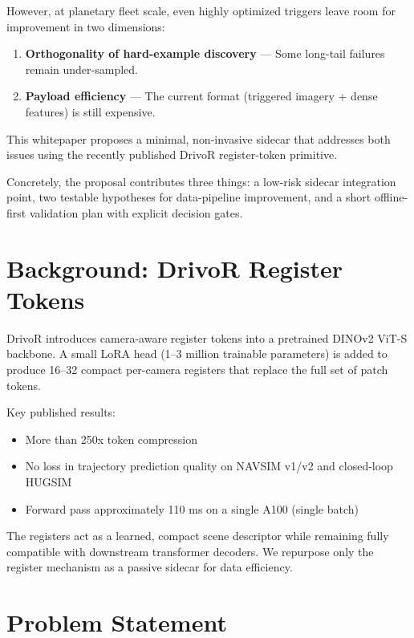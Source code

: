 \documentclass[11pt]{article}
\begin{document}
However, at planetary fleet scale, even highly optimized triggers leave room for improvement in two dimensions:

\begin{enumerate}
  \item \textbf{Orthogonality of hard-example discovery} --- Some long-tail failures remain under-sampled.
  \item \textbf{Payload efficiency} --- The current format (triggered imagery + dense features) is still expensive.
\end{enumerate}

This whitepaper proposes a minimal, non-invasive sidecar that addresses both issues using the recently published DrivoR register-token primitive.

Concretely, the proposal contributes three things: a low-risk sidecar integration point, two testable hypotheses for data-pipeline improvement, and a short offline-first validation plan with explicit decision gates.

\section{Background: DrivoR Register Tokens}

DrivoR \cite{kirby2026drivor} introduces camera-aware register tokens into a pretrained DINOv2 ViT-S backbone. A small LoRA head (1--3 million trainable parameters) is added to produce 16--32 compact per-camera registers that replace the full set of patch tokens.

Key published results:

\begin{itemize}
  \item More than 250x token compression
  \item No loss in trajectory prediction quality on NAVSIM v1/v2 and closed-loop HUGSIM
  \item Forward pass approximately 110 ms on a single A100 (single batch)
\end{itemize}

The registers act as a learned, compact scene descriptor while remaining fully compatible with downstream transformer decoders. We repurpose only the register mechanism as a passive sidecar for data efficiency.

\section{Problem Statement}
\end{document}
